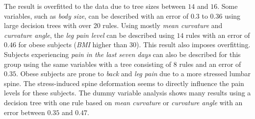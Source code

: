 \documentclass[a4paper,twoside]{style/article}
\begin{document}
The result is overfitted to the data due to tree sizes between $14$ and $16$.
Some variables, such as \emph{body size}, can be described with an error of $0.3$ to $0.36$ using large decision trees with over 20 rules.
Using mostly \emph{mean curvature} and \emph{curvature angle}, the \emph{leg pain level} can be described using $14$ rules with an error of $0.46$ for obese subjects (\emph{BMI} higher than $30$).
This result also imposes overfitting.
Subjects experiencing \emph{pain in the last seven days} can also be described for this group using the same variables with a tree consisting of $8$ rules and an error of $0.35$.
Obese subjects are prone to \emph{back} and \emph{leg pain} due to a more stressed lumbar spine.
The stress-induced spine deformation seems to directly influence the pain levels for these subjects.
The dummy variable analysis shows many results using a decision tree with one rule based on \emph{mean curvature} or \emph{curvature angle} with an error between $0.35$ and $0.47$.
\end{document}
